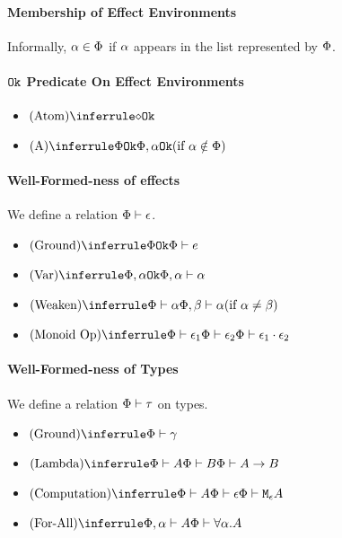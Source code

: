 {    \paragraph{Membership of Effect Environments}
    Informally, $\a \in \P$ if $\a$ appears in the list represented by $\P$.
    
    \paragraph{$\ok{}$ Predicate On Effect Environments}
    \begin{itemize}
        \item $\ntreerulez{Atom}{\ok{\nil}}$
        \item $\condtreeruleI{A}{\ok{\P}}{\ok{\P, \a}}{ \a\notin \P}$
    \end{itemize}
    
    \paragraph{Well-Formed-ness of effects}
    We define a relation $\wellformed{\P}{\e}$.
    
    \begin{itemize}
        \item $\ntreeruleI{Ground}{\ok{\P}}{\wellformed{\P}{e}}$
        \item $\ntreeruleI{Var}{\ok{\P,\a}}{\wellformed{\P,\a}{\a}}$
        \item $\condtreeruleI{Weaken}{\wellformed{\P}{\a}}{\wellformed{\P,\b}{\a}}{\a\neq\b}$
        \item $\ntreeruleII{Monoid Op}{\wellformed{\P}{\e_1}}{\wellformed{\P}{\e_2}}{\wellformed{\P}{\e_1\dot\e_2}}$
    \end{itemize}
    
    \paragraph{Well-Formed-ness of Types}
    We define a relation $\wellformed{\P}{\tau}$ on types.
    
    \begin{itemize}
        \item $\ntreerulez{Ground}{\wellformed{\P}{\g}}$
        \item $\ntreeruleII{Lambda}{\wellformed{\P}{A}}{\wellformed{\P}{B}}{\wellformed{\P}{\ab}}$
        \item $\ntreeruleII{Computation}{\wellformed{\P}{A}}{\wellformed{\P}{\e}}{\wellformed{\P}{\mea}}$
        \item $\ntreeruleI{For-All}{\wellformed{\P,\a}{A}}{\wellformed{\P}{\all{\a}{A}}}$
    \end{itemize}
    
}
